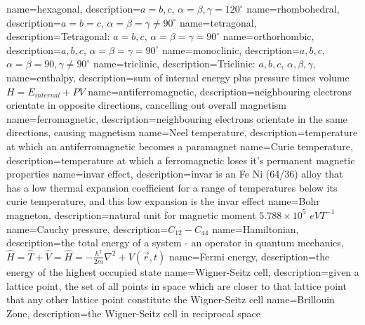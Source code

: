 {
    name=hexagonal,
    description={$a = b, c $, $ \alpha = \beta, \gamma = 120^{\circ}$}
}
{
    name=rhombohedral,
    description={$a = b = c $, $ \alpha = \beta = \gamma \neq 90^{\circ}$}
}
{
    name=tetragonal,
    description={Tetragonal: $a = b, c $, $ \alpha = \beta = \gamma = 90^{\circ}$}
}
{
    name=orthorhombic,
    description={$a, b, c $, $ \alpha = \beta = \gamma = 90^{\circ}$}
}
{
    name=monoclinic,
    description={$a, b, c $, $ \alpha = \beta = 90, \gamma \neq 90^{\circ}$}
}
{
    name=triclinic,
    description={Triclinic: $a, b, c $, $ \alpha, \beta, \gamma, $}
}
{
    name=enthalpy,
    description={sum of internal energy plus pressure times volume $H = E_{internal} + PV$}
}
{
    name=antiferromagnetic,
    description={neighbouring electrons orientate in opposite directions, cancelling out overall magnetism}
}
{
    name=ferromagnetic,
    description={neighbouring electrons orientate in the same directions, causing magnetism}
}
{
    name=Neel temperature,
    description={temperature at which an antiferromagnetic becomes a paramagnet}
}
{
    name=Curie temperature,
    description={temperature at which a ferromagnetic loses it's permanent magnetic properties}
}
{
    name=invar effect,
    description={invar is an Fe Ni (64/36) alloy that has a low thermal expansion coefficient for a range of temperatures below its curie temperature, and this low expansion is the invar effect}
}
{
    name=Bohr magneton,
    description={natural unit for magnetic moment $5.788 \times 10^5$ $eV T^{-1}$}
}
{
    name=Cauchy pressure,
    description={$C_{12}-C_{44}$}
}
{
    name=Hamiltonian,
    description={the total energy of a system - an operator in quantum mechanics, $\hat{H} = \hat{T} + \hat{V} = \hat{H} = -\frac{\hbar^2}{2m} \nabla^2 + V(\vec{r},t)$ }
}
{
    name=Fermi energy,
    description={the energy of the highest occupied state}
}
{
    name={Wigner-Seitz cell},
    description={given a lattice point, the set of all points in space which are closer to that lattice point that any other lattice point constitute the Wigner-Seitz cell\cite{solidstatebasicswcs}  \protect{}}
}
{
    name={Brillouin Zone},
    description={the Wigner-Seitz cell in reciprocal space}
}

